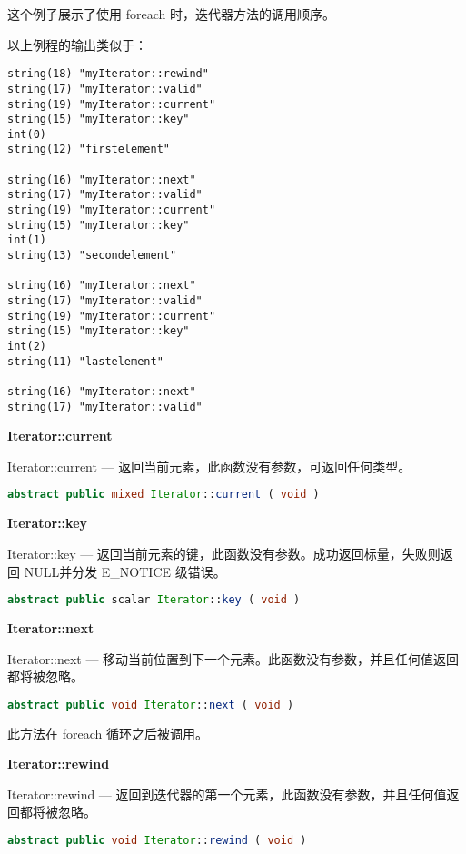 这个例子展示了使用 foreach 时，迭代器方法的调用顺序。

以上例程的输出类似于：

\begin{verbatim}
string(18) "myIterator::rewind"
string(17) "myIterator::valid"
string(19) "myIterator::current"
string(15) "myIterator::key"
int(0)
string(12) "firstelement"

string(16) "myIterator::next"
string(17) "myIterator::valid"
string(19) "myIterator::current"
string(15) "myIterator::key"
int(1)
string(13) "secondelement"

string(16) "myIterator::next"
string(17) "myIterator::valid"
string(19) "myIterator::current"
string(15) "myIterator::key"
int(2)
string(11) "lastelement"

string(16) "myIterator::next"
string(17) "myIterator::valid"
\end{verbatim}


\textbf{Iterator::current}

Iterator::current — 返回当前元素，此函数没有参数，可返回任何类型。



\begin{lstlisting}[language=PHP]
abstract public mixed Iterator::current ( void )
\end{lstlisting}

\textbf{Iterator::key}


Iterator::key — 返回当前元素的键，此函数没有参数。成功返回标量，失败则返回 NULL并分发 E\_NOTICE 级错误。

\begin{lstlisting}[language=PHP]
abstract public scalar Iterator::key ( void )
\end{lstlisting}


\textbf{Iterator::next}

Iterator::next — 移动当前位置到下一个元素。此函数没有参数，并且任何值返回都将被忽略。

\begin{lstlisting}[language=PHP]
abstract public void Iterator::next ( void )
\end{lstlisting}

此方法在 foreach 循环之后被调用。

\textbf{Iterator::rewind}

Iterator::rewind — 返回到迭代器的第一个元素，此函数没有参数，并且任何值返回都将被忽略。

\begin{lstlisting}[language=PHP]
abstract public void Iterator::rewind ( void )
\end{lstlisting}

